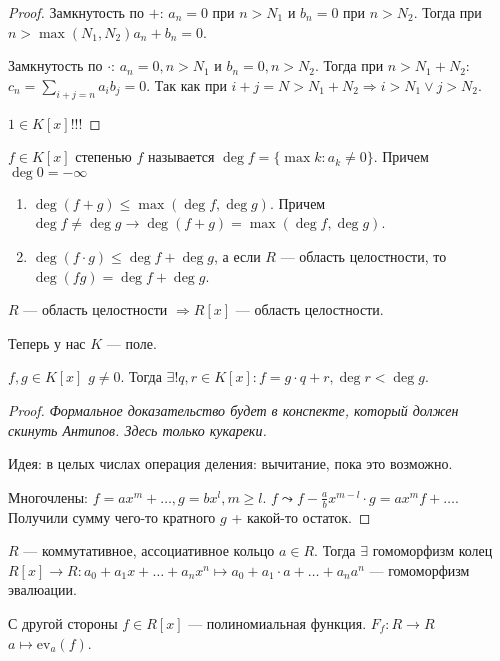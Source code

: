 \begin{proof}
    Замкнутость по $+$:  $a_n = 0$ при  $n > N_1$ и  $b_n = 0$ при $n > N_2$. Тогда при $n > \max(N_1, N_2) a_n+b_n = 0$.

    Замкнутость по $\cdot$:  $a_n = 0, n > N_1$ и $b_n = 0, n > N_2$. Тогда при  $n > N_1+N_2:$ $c_n = \sum_{i+j=n} a_ib_j = 0$. Так как при  $i + j = N > N_1+N_2 \Rightarrow i > N_1 \lor j > N_2$.

    $1 \in K[x]$!!!
\end{proof}
\begin{definition}
    $f \in K[x]$ степенью  $f$ называется  $\deg f = \{\max k: a_k \neq 0\}$. Причем $\deg 0 = -\infty$
\end{definition}
\begin{properties}
    \slashn
    \begin{enumerate}
        \item $\deg (f+g) \le \max(\deg f, \deg g)$. Причем $\deg f \neq \deg g \to \deg(f+g) = \max(\deg f, \deg g)$. 
        \item $\deg(f\cdot g) \le \deg f + \deg g$, а если $R$ --- область целостности, то  $\deg (fg) = \deg f + \deg g$.
    \end{enumerate}
\end{properties}
\begin{consequence}
    $R$ --- область целостности  $\Rightarrow R[x]$ --- область целостности.
\end{consequence}
\slashn
Теперь у нас $K$ --- поле.
\begin{theorem}
    $f, g \in K[x]$ $g \neq 0$. Тогда  $\exists! q, r \in K[x]: f = g\cdot q + r, \deg r < \deg g$.
\end{theorem}
\begin{proof}
    \textit{Формальное доказательство будет в конспекте, который должен скинуть Антипов. Здесь только кукареки.}

    Идея: в целых числах операция деления: вычитание, пока это возможно.

    Многочлены: $f=ax^m + \ldots, g = bx^l, m\ge l$. $f \leadsto f - \frac{a}{b}x^{m-l} \cdot g = ax^mf + \ldots$. Получили сумму чего-то кратного $g$ + какой-то остаток. 
\end{proof}
\begin{consequence}
    $R$ --- коммутативное, ассоциативное кольцо  $a \in R$. Тогда $\exists$ гомоморфизм колец  $R[x] \to R: a_0 + a_1 x + \ldots + a_n x^n \mapsto a_0 + a_1 \cdot a + \ldots + a_n a^n$ --- гомоморфизм эвалюации. 

    С другой стороны $f \in R[x]$ --- полиномиальная функция.  $F_f: R \to R$  $a \mapsto \text{ev}_a(f)$.
\end{consequence}
